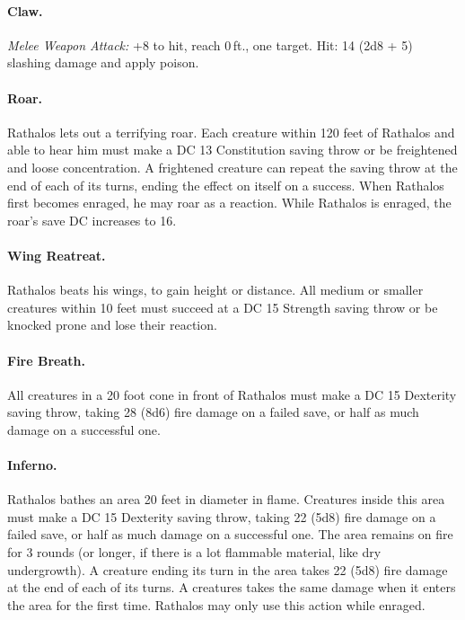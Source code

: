 \begin{hbMonsterNoteWide}[b]
\begin{multicols}{2}
\begin{hbStatBlock}
\paragraph*{Claw.} \textit{Melee Weapon Attack:} +8 to hit, reach 0\,ft., one target. Hit: 14 (2d8 + 5) slashing damage and apply poison.

\paragraph*{Roar.} Rathalos lets out a terrifying roar. Each creature within 120 feet of Rathalos and able to hear him must make a DC 13 Constitution saving throw or be freightened and loose concentration. A frightened creature can repeat the saving throw at the end of each of its turns, ending the effect on itself on a success. When Rathalos first becomes enraged, he may roar as a reaction. While Rathalos is enraged, the roar's save DC increases to 16.

\paragraph*{Wing Reatreat.} Rathalos beats his wings, to gain height or distance. All medium or smaller creatures within 10 feet must succeed at a DC 15 Strength saving throw or be knocked prone and lose their reaction.

\paragraph*{Fire Breath.} All creatures in a 20 foot cone in front of Rathalos must make a DC 15 Dexterity saving throw, taking 28 (8d6) fire damage on a failed save, or half as much damage on a successful one.

\paragraph*{Inferno.} Rathalos bathes an area 20 feet in diameter in flame. Creatures inside this area must make a DC 15 Dexterity saving throw, taking 22 (5d8) fire damage on a failed save, or half as much damage on a successful one. The area remains on fire for 3 rounds (or longer, if there is a lot flammable material, like dry undergrowth). A creature ending its turn in the area takes 22 (5d8) fire damage at the end of each of its turns. A creatures takes the same damage when it enters the area for the first time. Rathalos may only use this action while enraged.

\end{hbStatBlock}
\end{multicols}
\end{hbMonsterNoteWide}

